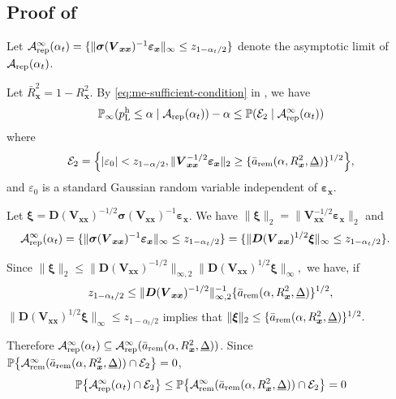 \documentclass[12pt]{article}
\newcommand{\Prob}{\mathbb{P}}
\newcommand{\ma}{\mathcal{A}}
\newcommand{\rem}{\textnormal{rem}}
\newcommand{\rep}{\textnormal{rep}}
\newcommand{\bs}{\boldsymbol}
\newcommand{\hpL}{p_\textnormal{L}^{\textnormal{h}}}
\begin{document}
\subsection{Proof of }
Let $\ma_{\rep}^{\infty}(\alpha_t) = \{\|\bs{\sigma}(\bs{V}_{\bs{x}\bs{x}})^{-1}\bs{\varepsilon}_{\bs{x}}\|_{\infty} \leq z_{1-\alpha_t/2}\}$ denote the asymptotic limit of $\ma_{\rep}(\alpha_t)$.

 Let $\bar{R}_{\bs{x}}^2 = 1- R_{\bs{x}}^2$. By \eqref{eq:me-sufficient-condition} in , we have 
\begin{align*}
    \Prob_{\infty}(\hpL \leq \alpha \mid \ma_{\rep}(\alpha_t)) -\alpha \leq \Prob(\mathcal{E}_2\mid \ma_{\rep}^{\infty}(\alpha_t))
\end{align*}
where
\begin{align*}
   \mathcal{E}_2 =  \Big\{|\varepsilon_0| < z_{1-\alpha/2}, \|\bs{V}_{\bs{x}\bs{x}}^{-1/2}\bs{\varepsilon}_{\bs{x}}\|_2 \geq   \{\bar{a}_{\rem}(\alpha, R^2_{\bs{x}}, \underline{\Delta})\}^{1/2}\Big\},
\end{align*}
and $\varepsilon_0$ is a standard Gaussian random variable independent of $\bs{\varepsilon}_{\bs{x}}$.

Let $ \bs{\xi}= \bs{D}(\bs{V}_{\bs{x}\bs{x}})^{-1/2}\bs{\sigma}(\bs{V}_{\bs{x}\bs{x}})^{-1}\bs{\varepsilon}_{\bs{x}}$. We have $\|\bs{\xi}\|_2 = \|\bs{V}_{\bs{x}\bs{x}}^{-1/2}\bs{\varepsilon}_{\bs{x}}\|_2$ and
\begin{align*}
    \ma_{\rep}^{\infty}(\alpha_t) &= \{\|\bs{\sigma}(\bs{V}_{\bs{x}\bs{x}})^{-1}\bs{\varepsilon}_{\bs{x}}\|_{\infty} \leq z_{1-\alpha_t/2}\} = \{\|\bs{D}(\bs{V}_{\bs{x}\bs{x}})^{1/2}\bs{\xi}\|_{\infty} \leq z_{1-\alpha_t/2}\}.
\end{align*}

Since $\|\bs{\xi}\|_2 \leq \|\bs{D}(\bs{V}_{\bs{x}\bs{x}})^{-1/2}\|_{\infty,2} \|\bs{D}(\bs{V}_{\bs{x}\bs{x}})^{1/2}\bs{\xi}\|_{\infty},$
we have, if
\[
z_{1-\alpha_t/2} \leq  \|\bs{D}(\bs{V}_{\bs{x}\bs{x}})^{-1/2}\|_{\infty,2}^{-1} \{\bar{a}_{\rem}(\alpha, R^2_{\bs{x}}, \underline{\Delta})\}^{1/2},
\]
 $\|\bs{D}(\bs{V}_{\bs{x}\bs{x}})^{1/2}\bs{\xi}\|_{\infty} \leq z_{1-\alpha_t/2}$ implies that $\|\bs{\xi}\|_2  \leq  \{\bar{a}_{\rem}(\alpha, R^2_{\bs{x}}, \underline{\Delta})\}^{1/2}.$

Therefore $\ma_{\rep}^{\infty}(\alpha_t) \subseteq \ma_{\rep}^\infty(\bar{a}_{\rem}(\alpha, R^2_{\bs{x}},\underline{\Delta}))$. Since $\Prob\big\{\ma_{\rem}^\infty(\bar{a}_{\rem}(\alpha, R^2_{\bs{x}},\underline{\Delta})) \cap \mathcal{E}_2\big\} = 0$,
\[
 \Prob\big\{\ma_{\rep}^{\infty}(\alpha_t) \cap \mathcal{E}_2\big\} \leq \Prob\big\{\ma_{\rem}^\infty(\bar{a}_{\rem}(\alpha, R^2_{\bs{x}},\underline{\Delta})) \cap \mathcal{E}_2\big\} = 0
\]
\end{document}
